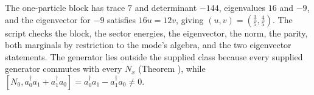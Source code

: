 The one-particle block has trace $7$ and determinant $-144$, eigenvalues $16$ and $-9$, and the eigenvector for $-9$ satisfies $16u = 12v$, giving $(u, v) = (\tfrac35, \tfrac45)$. The script checks the block, the sector energies, the eigenvector, the norm, the parity, both marginals by restriction to the mode's algebra, and the two eigenvector statements. The generator lies outside the supplied class because every supplied generator commutes with every $N_{x}$ (Theorem ), while $[N_{0}, a^{\dagger}_{0}a_{1} + a^{\dagger}_{1}a_{0}] = a^{\dagger}_{0}a_{1} - a^{\dagger}_{1}a_{0} \neq 0$.
